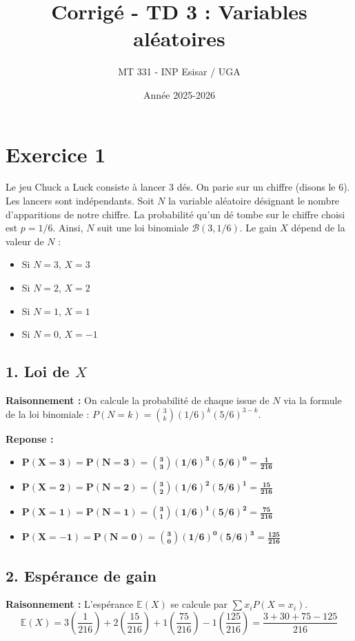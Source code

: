 \documentclass[11pt,a4paper]{article}
\title{Corrigé - TD 3 : Variables aléatoires}
\author{MT 331 - INP Esisar / UGA}
\date{Année 2025-2026}
\begin{document}
\maketitle

\section*{Exercice 1}

Le jeu Chuck a Luck consiste à lancer 3 dés. On parie sur un chiffre (disons le 6). Les lancers sont indépendants.
Soit $N$ la variable aléatoire désignant le nombre d'apparitions de notre chiffre. La probabilité qu'un dé tombe sur le chiffre choisi est $p = 1/6$. Ainsi, $N$ suit une loi binomiale $\mathcal{B}(3, 1/6)$.
Le gain $X$ dépend de la valeur de $N$ :
\begin{itemize}
    \item Si $N=3$, $X=3$
    \item Si $N=2$, $X=2$
    \item Si $N=1$, $X=1$
    \item Si $N=0$, $X=-1$
\end{itemize}

\subsection*{1. Loi de $X$}

\textbf{Raisonnement :} On calcule la probabilité de chaque issue de $N$ via la formule de la loi binomiale : $P(N=k) = \binom{3}{k}(1/6)^k(5/6)^{3-k}$.

\textbf{Reponse :}
\begin{itemize}
    \item $\mathbf{P(X=3) = P(N=3) = \binom{3}{3}(1/6)^3(5/6)^0 = \frac{1}{216}}$
    \item $\mathbf{P(X=2) = P(N=2) = \binom{3}{2}(1/6)^2(5/6)^1 = \frac{15}{216}}$
    \item $\mathbf{P(X=1) = P(N=1) = \binom{3}{1}(1/6)^1(5/6)^2 = \frac{75}{216}}$
    \item $\mathbf{P(X=-1) = P(N=0) = \binom{3}{0}(1/6)^0(5/6)^3 = \frac{125}{216}}$
\end{itemize}

\subsection*{2. Espérance de gain}

\textbf{Raisonnement :} L'espérance $\mathbb{E}(X)$ se calcule par $\sum x_i P(X=x_i)$.
$$ \mathbb{E}(X) = 3\left(\frac{1}{216}\right) + 2\left(\frac{15}{216}\right) + 1\left(\frac{75}{216}\right) - 1\left(\frac{125}{216}\right) = \frac{3 + 30 + 75 - 125}{216} $$
\end{document}
